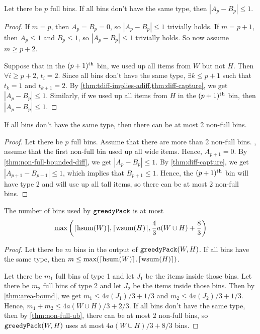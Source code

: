 \begin{lemma}
\label{thm:non-full-bounded-diff}
Let there be $p$ full bins. If all bins don't have the same type, then $|A_p - B_p| \le 1$.
\end{lemma}
\begin{proof}
If $m = p$, then $A_p = B_p = 0$, so $|A_p - B_p| \le 1$ trivially holds.
If $m = p+1$, then $A_p \le 1$ and $B_p \le 1$, so $|A_p - B_p| \le 1$ trivially holds.
So now assume $m \ge p+2$.

Suppose that in the $(p+1)^{\textrm{th}}$ bin, we used up all items from $W$ but not $H$.
Then $\forall i \ge p+2$, $t_i = 2$.
Since all bins don't have the same type, $\exists k \le p+1$ such that
$t_k = 1$ and $t_{k+1} = 2$.
By \cref{thm:tdiff-implies-adiff,thm:diff-capture}, we get $|A_p - B_p| \le 1$.
Similarly, if we used up all items from $H$ in the $(p+1)^{\textrm{th}}$ bin, then $|A_p - B_p| \le 1$.
\end{proof}

\begin{lemma}
\label{thm:non-full-ub}
If all bins don't have the same type, then there can be at most 2 non-full bins.
\end{lemma}
\begin{proof}
Let there be $p$ full bins. Assume that there are more than 2 non-full bins.
\WLoG, assume that the first non-full bin used up all wide items.
Hence, $A_{p+1} = 0$.
By \cref{thm:non-full-bounded-diff}, we get $|A_p - B_p| \le 1$.
By \cref{thm:diff-capture}, we get $|A_{p+1} - B_{p+1}| \le 1$,
which implies that $B_{p+1} \le 1$.
Hence, the $(p+1)^{\textrm{th}}$ bin will have type 2 and will use up all tall items,
so there can be at most 2 non-full bins.
\end{proof}

\begin{theorem}
\label{thm:greedy-pack-bins}
The number of bins used by $\operatorname{\mathtt{greedyPack}}$ is at most
\[ \max\left(\lceil \operatorname{hsum}(W) \rceil, \lceil \operatorname{wsum}(H) \rceil,
    \frac{4}{3}a(W \cup H) + \frac{8}{3}\right) \]
\end{theorem}
\begin{proof}
Let there be $m$ bins in the output of $\operatorname{\mathtt{greedyPack}}(W, H)$.
If all bins have the same type, then $m \le \max(\lceil \operatorname{hsum}(W) \rceil, \lceil \operatorname{wsum}(H) \rceil)$.

Let there be $m_1$ full bins of type 1 and let $J_1$ be the items inside those bins.
Let there be $m_2$ full bins of type 2 and let $J_2$ be the items inside those bins.
Then by \cref{thm:area-bound}, we get $m_1 \le 4a(J_1)/3 + 1/3$ and $m_2 \le 4a(J_2)/3 + 1/3$.
Hence, $m_1 + m_2 \le 4a(W \cup H)/3 + 2/3$.
If all bins don't have the same type, then by \cref{thm:non-full-ub},
there can be at most 2 non-full bins, so $\operatorname{\mathtt{greedyPack}}(W, H)$
uses at most $4a(W \cup H)/3 + 8/3$ bins.
\end{proof}

